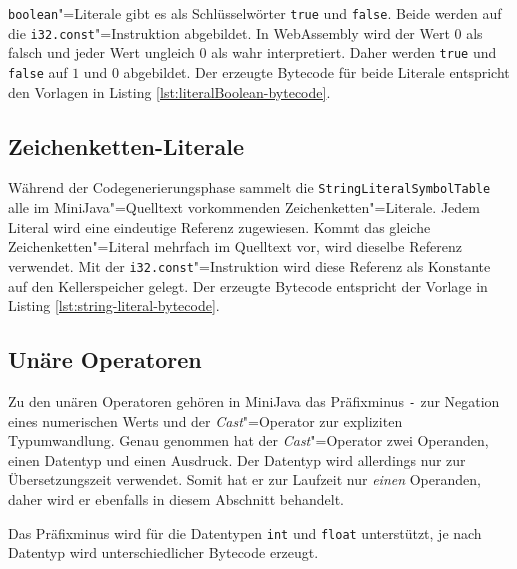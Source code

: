

\lstinline{boolean}"=Literale gibt es als Schlüsselwörter \lstinline{true} und \lstinline{false}. Beide werden auf die \lstinline{i32.const}"=Instruktion abgebildet. In WebAssembly wird der Wert $0$ als falsch und jeder Wert ungleich $0$ als wahr interpretiert. Daher werden \lstinline{true} und \lstinline{false} auf $1$ und $0$ abgebildet. Der erzeugte Bytecode für beide Literale entspricht den Vorlagen in Listing \ref{lst:literalBoolean-bytecode}.



\subsection{Zeichenketten-Literale}
\label{subsec:Zeichenketten-Literale}

Während der Codegenerierungsphase sammelt die \lstinline{StringLiteralSymbolTable} alle im MiniJava"=Quelltext vorkommenden Zeichenketten"=Literale. Jedem Literal wird eine eindeutige Referenz zugewiesen. Kommt das gleiche Zeichenketten"=Literal mehrfach im Quelltext vor, wird dieselbe Referenz verwendet. Mit der \lstinline{i32.const}"=Instruktion wird diese Referenz als Konstante auf den Kellerspeicher gelegt. Der erzeugte Bytecode entspricht der Vorlage in Listing \ref{lst:string-literal-bytecode}.



\subsection{Unäre Operatoren}
Zu den unären Operatoren gehören in MiniJava das Präfixminus \lstinline{-} zur Negation eines numerischen Werts und der \emph{Cast}"=Operator zur expliziten Typumwandlung. Genau genommen hat der \emph{Cast}"=Operator zwei Operanden, einen Datentyp und einen Ausdruck. Der Datentyp wird allerdings nur zur Übersetzungszeit verwendet. Somit hat er zur Laufzeit nur \emph{einen} Operanden, daher wird er ebenfalls in diesem Abschnitt behandelt.

Das Präfixminus wird für die Datentypen \lstinline{int} und \lstinline{float} unterstützt, je nach Datentyp wird unterschiedlicher Bytecode erzeugt.

